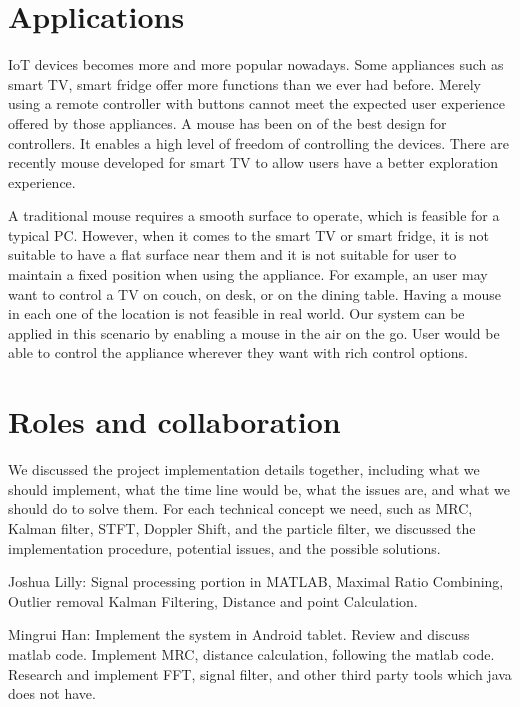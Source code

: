 \documentclass{acm_proc_article-sp}
\begin{document}
\section{Applications} \label{applications}
IoT devices becomes more and more popular nowadays. Some appliances
such as smart TV, smart fridge offer more functions than we ever
had before. Merely using a remote controller with buttons cannot meet
the expected user experience offered by those appliances. A mouse has
been on of the best design for controllers. It enables a high level of 
freedom of controlling the devices. There are recently mouse developed
for smart TV to allow users have a better exploration experience. 

A traditional mouse requires a smooth surface to operate, which is 
feasible for a typical PC. However, when it comes to the smart TV
or smart fridge, it is not suitable to have a flat surface near them
and it is not suitable for user to maintain a fixed position when
using the appliance. For example, an user may want to control a TV 
on couch, on desk, or on the dining table. Having a mouse in each
one of the location is not feasible in real world. Our system can be
applied in this scenario by enabling a mouse in the air on the go.
User would be able to control the appliance wherever they want with
rich control options.

\section{Roles and collaboration} \label{roles and collaboration}
We discussed the project implementation details together, including
what we should implement, what the time line would be, what the issues
are, and what we should do to solve them. For each technical concept
we need, such as MRC, Kalman filter, STFT, Doppler Shift, and the
particle filter, we discussed the implementation procedure, 
potential issues, and the possible solutions.

Joshua Lilly: Signal processing portion in MATLAB, Maximal Ratio Combining, Outlier removal Kalman Filtering, Distance and point Calculation.

Mingrui Han: Implement the system in Android tablet. Review and discuss matlab code. Implement MRC, distance calculation, following the matlab code. 
Research and implement FFT, signal filter, and other third party tools which java 
does not have. 
\end{document}
